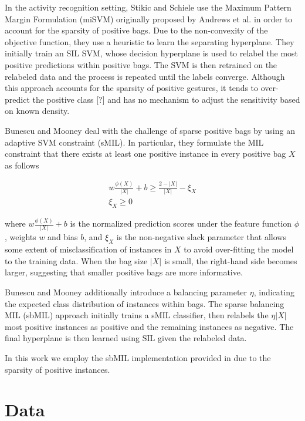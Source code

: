\documentclass{sigchi}
\begin{document}
In the activity recognition setting, Stikic and Schiele use the Maximum Pattern Margin Formulation (miSVM) originally proposed by Andrews et al. \cite{Andrews03supportvector} in order to account for the sparsity of positive bags. Due to the non-convexity of the objective function, they use a heuristic to learn the separating hyperplane. They initially train an SIL SVM, whose decision hyperplane is used to relabel the most positive predictions within positive bags. The SVM is then retrained on the relabeled data and the process is repeated until the labels converge. Although this approach accounts for the sparsity of positive gestures, it tends to over-predict the positive class [?] and has no mechanism to adjust the sensitivity based on known density.

Bunescu and Mooney \cite{bunescu:icml07} deal with the challenge of sparse positive bags by using an adaptive SVM constraint (sMIL). In particular, they formulate the MIL constraint that there exists at least one positive instance in every positive bag $X$ as follows

\begin{align*}
	w \frac{\phi(X)}{\left| X \right|} + b \geq \frac{2 - \left| X \right|}{\left| X \right|} - \xi_X \\
	\xi_X \geq 0
\end{align*}

where $w \frac{\phi(X)}{\left| X \right|} + b$ is the normalized prediction scores under the feature function $\phi$, weights $w$ and bias $b$, and $\xi_X$ is the non-negative slack parameter that allows some extent of misclassification of instances in $X$ to avoid over-fitting the model to the training data. When the bag size $\left| X \right|$ is small, the right-hand side becomes larger, suggesting that smaller positive bags are more informative.

Bunescu and Mooney additionally introduce a balancing parameter $\eta$, indicating the expected class distribution of instances within bags. The sparse balancing MIL (sbMIL) approach initially trains a sMIL classifier, then relabels the $\eta \left| X \right|$ most positive instances as positive and the remaining instances as negative. The final hyperplane is then learned using SIL given the relabeled data.

In this work we employ the sbMIL implementation provided in \cite{Doran:2014:TEA:2666867.2666935} due to the sparsity of positive instances.

\section{Data}
\end{document}
